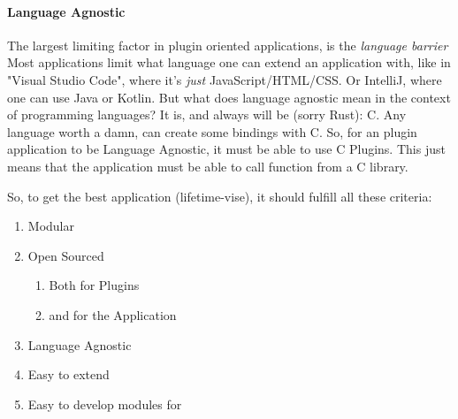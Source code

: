 \paragraph{Language Agnostic} The largest limiting factor in plugin oriented
applications, is the \textit{language barrier} Most applications limit what
language one can extend an application with, like in "Visual Studio Code", where
it's \textit{just} JavaScript/HTML/CSS. Or IntelliJ, where one can use Java or
Kotlin. But what does language agnostic mean in the context of programming
languages? It is, and always will be (sorry Rust): C. Any language worth a damn,
can create some bindings with C. So, for an plugin application to be Language
Agnostic, it must be able to use C Plugins. This just means that the application
must be able to call function from a C library.

So, to get the best application (lifetime-vise), it should fulfill all these criteria:

\begin{enumerate}
  \item Modular
  \item Open Sourced
    \begin{enumerate}
      \item Both for Plugins
      \item and for the Application
    \end{enumerate}
  \item Language Agnostic
  \item Easy to extend
  \item Easy to develop modules for
\end{enumerate}
